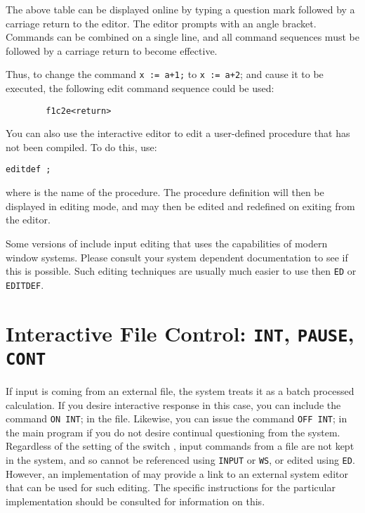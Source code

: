 The above table can be displayed online by typing a question mark followed
by a carriage return to the editor. The editor prompts with an angle
bracket. Commands can be combined on a single line, and all command
sequences must be followed by a carriage return to become effective.

Thus, to change the command \texttt{x := a+1;} to \texttt{x := a+2}; and cause
it to be executed, the following edit command sequence could be used:
\begin{verbatim}
        f1c2e<return>
\end{verbatim}
\hypertarget{command:EDITDEF}{}
You can also use the interactive editor to edit a user-defined
procedure that has not been compiled.  To do this, use:
\begin{syntax}
  \texttt{editdef }\texttt{;}
\end{syntax}
where  is the name of the procedure.  The procedure definition
will then be displayed in editing mode, and may then be edited and
redefined on exiting from the editor.

Some versions of {\REDUCE} include input editing that uses the
capabilities of modern window systems.  Please consult your system
dependent documentation to see if this is possible.  Such editing
techniques are usually much easier to use then \texttt{ED} or
\texttt{EDITDEF}.

\section{Interactive File Control:
  \texttt{\small INT}, \texttt{\small PAUSE}, \texttt{\small CONT}}

\hypertarget{switch:INT}{}
If input is coming from an external file, the system treats it as a
batch processed calculation.  If you desire
interactive response in this case, you can
include the command \texttt{ON INT}; in the file.
Likewise, you can issue the command \texttt{OFF INT}; in the main
program if you do not desire continual questioning from the system.
Regardless of the setting of the switch , input commands from
a file are not kept in the system, and so cannot be referenced using
\texttt{INPUT} or \texttt{WS}, or edited using \texttt{ED}.  However,
an implementation of {\REDUCE} may provide a link to an external
system editor that can be used for such editing.  The specific
instructions for the particular implementation should be consulted for
information on this.

